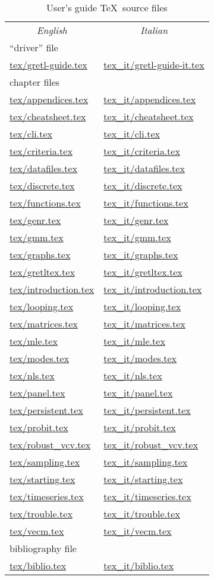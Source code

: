 \documentclass{article}
\begin{document}
\begin{table}[htbp]
\begin{center}
\begin{tabular}{ll}
\multicolumn{1}{c}{\textit{English}} & 
\multicolumn{1}{c}{\textit{Italian}} \\[6pt]
\multicolumn{2}{l}{``driver'' file} \\
\url{tex/gretl-guide.tex} & \url{tex_it/gretl-guide-it.tex} \\[6pt]
\multicolumn{2}{l}{chapter files} \\
\url{tex/appendices.tex} & \url{tex_it/appendices.tex} \\
\url{tex/cheatsheet.tex} & \url{tex_it/cheatsheet.tex} \\
\url{tex/cli.tex} & \url{tex_it/cli.tex} \\
\url{tex/criteria.tex} & \url{tex_it/criteria.tex} \\
\url{tex/datafiles.tex} & \url{tex_it/datafiles.tex} \\
\url{tex/discrete.tex} & \url{tex_it/discrete.tex} \\
\url{tex/functions.tex} & \url{tex_it/functions.tex} \\
\url{tex/genr.tex} & \url{tex_it/genr.tex} \\
\url{tex/gmm.tex} & \url{tex_it/gmm.tex} \\
\url{tex/graphs.tex} & \url{tex_it/graphs.tex} \\
\url{tex/gretltex.tex} & \url{tex_it/gretltex.tex} \\
\url{tex/introduction.tex} & \url{tex_it/introduction.tex} \\
\url{tex/looping.tex} & \url{tex_it/looping.tex} \\
\url{tex/matrices.tex} & \url{tex_it/matrices.tex} \\
\url{tex/mle.tex} & \url{tex_it/mle.tex} \\
\url{tex/modes.tex} & \url{tex_it/modes.tex} \\
\url{tex/nls.tex} & \url{tex_it/nls.tex} \\
\url{tex/panel.tex} & \url{tex_it/panel.tex} \\
\url{tex/persistent.tex} & \url{tex_it/persistent.tex} \\
\url{tex/probit.tex} & \url{tex_it/probit.tex} \\
\url{tex/robust_vcv.tex} & \url{tex_it/robust_vcv.tex} \\
\url{tex/sampling.tex} & \url{tex_it/sampling.tex} \\
\url{tex/starting.tex} & \url{tex_it/starting.tex} \\
\url{tex/timeseries.tex} & \url{tex_it/timeseries.tex} \\
\url{tex/trouble.tex} & \url{tex_it/trouble.tex} \\
\url{tex/vecm.tex} & \url{tex_it/vecm.tex} \\ [6pt]
\multicolumn{2}{l}{bibliography file} \\
\url{tex/biblio.tex} & \url{tex_it/biblio.tex} \\
\end{tabular}
\end{center}
\caption{User's guide \TeX\ source files}
\label{guide-files}
\end{table}
\end{document}
